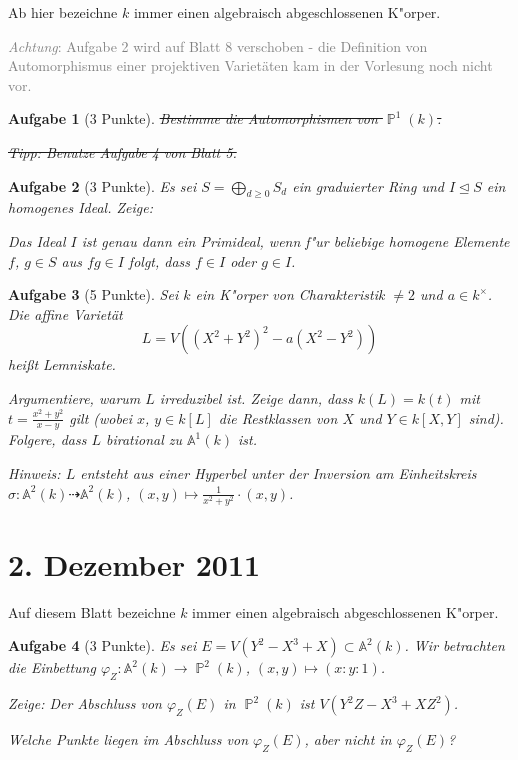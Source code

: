 \documentclass[a4paper, 12pt, numbers=noendperiod, chapterprefix=true]{scrbook}
\theoremstyle{break}
\newtheorem{Aufg}{Aufgabe}
\theoremstyle{nonumberbreak}
\theoremstyle{nonumberplain}
\DeclareMathOperator{\ideal}{\unlhd}
\newcommand{\A}{\mathbb{A}}
\newcommand{\Affine}{\mathbb{A}} %
\DeclareMathOperator{\Projective}{\mathbb{P}} %
\begin{document}
Ab hier bezeichne $k$ immer einen algebraisch abgeschlossenen K"orper.

\textcolor{gray}{\emph{Achtung}: Aufgabe 2 wird auf Blatt 8 verschoben - die Definition von Automorphismus einer projektiven Variet\"aten kam in der Vorlesung noch nicht vor.}
\begin{Aufg}[3 Punkte]
\sout{Bestimme die Automorphismen von $\Projective^1(k)$.}

\sout{\emph{Tipp:} Benutze Aufgabe 4 von Blatt 5.}
\end{Aufg}

\begin{Aufg}[3 Punkte]
Es sei $S = \bigoplus_{d\geq 0} S_d$ ein graduierter Ring und $I\ideal S$ ein homogenes Ideal. Zeige:

Das Ideal $I$ ist genau dann ein Primideal, wenn f"ur beliebige homogene Elemente $f$, $g\in S$ aus $fg\in I$ folgt, dass $f\in I$ oder $g\in I$.
\end{Aufg}

\begin{Aufg}[5 Punkte]
Sei $k$ ein K"orper von Charakteristik $\neq 2$ und  $a\in k^\times$. Die affine Variet\"at
	\[L = V((X^2+Y^2)^2 - a(X^2-Y^2))\]
hei\ss t \emph{Lemniskate}. 

Argumentiere, warum $L$ irreduzibel ist. Zeige dann, dass $k(L) = k(t)$ mit $t = \frac{x^2+y^2}{x-y}$ gilt (wobei $x$, $y\in k[L]$ die Restklassen von $X$ und $Y\in k[X,Y]$ sind). Folgere, dass $L$ birational zu $\Affine^1(k)$ ist.

\emph{Hinweis: $L$ entsteht aus einer Hyperbel unter der Inversion am Einheitskreis $\sigma: \Affine^2(k) \dashrightarrow \Affine^2(k)$, $(x,y)\mapsto \frac{1}{x^2+y^2}\cdot(x,y)$.}
\end{Aufg}

\newpage
\section{2. Dezember 2011}
\setcounter{Aufg}{0}
\setcounter{Loes}{0}

Auf diesem Blatt bezeichne $k$ immer einen algebraisch abgeschlossenen K"orper.

\begin{Aufg}[3 Punkte]
Es sei $E = V(Y^2 - X^3 + X)\subset \Affine^2(k)$. Wir betrachten die Einbettung $\varphi_Z: \Affine^2(k)\to \Projective^2(k)$, $(x,y)\mapsto (x:y:1)$.

Zeige: Der Abschluss von $\varphi_Z(E)$ in $\Projective^2(k)$ ist $V(Y^2Z - X^3 + XZ^2)$.

Welche Punkte liegen im Abschluss von $\varphi_Z(E)$, aber nicht in $\varphi_Z(E)$?
\end{Aufg}
\end{document}

